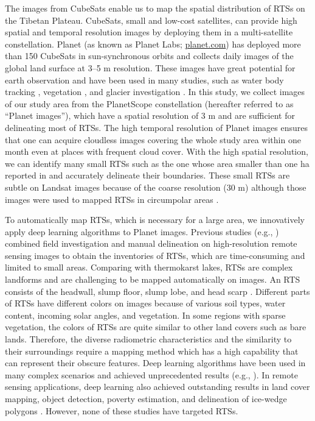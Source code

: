 \documentclass[preprint,12pt,authoryear]{elsarticle}
\begin{document}
The images from CubeSats enable us to map the spatial distribution of RTSs on the Tibetan Plateau. CubeSats, small and low-cost satellites, can provide high spatial and temporal resolution images by deploying them in a multi-satellite constellation. Planet (as known as Planet Labs; \url{planet.com}) has deployed more than 150 CubeSats in sun-synchronous orbits and collects daily images of the global land surface at 3--5 m resolution. These images have great potential for earth observation and have been used in many studies, such as water body tracking \citep{cooley2017tracking, cooley2019arctic, aragon2018cubesats, miles2018glacial}, vegetation \citep{houborg2016high, houborg2018daily}, and glacier investigation \citep{altena2017glacier}. In this study, we collect images of our study area from the PlanetScope constellation (hereafter referred to as “Planet images”), which have a spatial resolution of 3 m and are sufficient for delineating most of RTSs. The high temporal resolution of Planet images ensures that one can acquire cloudless images covering the whole study area within one month even at places with frequent cloud cover. With the high spatial resolution, we can identify many small RTSs such as the one whose area smaller than one ha reported in \cite{niu2012development,niu2016thaw} and accurately delineate their boundaries. These small RTSs are subtle on Landsat images because of the coarse resolution (30 m) although those images were used to mapped RTSs in circumpolar areas \citep{lacelle_distribution_2015, brooker2014mapping, nitze2018remote}. %

To automatically map RTSs, which is necessary for a large area, we innovatively apply deep learning algorithms to Planet images. Previous studies (e.g., \citealp{ramage_terrain_2017, lantuit_fifty_2008, niu2014thaw}) combined field investigation and manual delineation on high-resolution remote sensing images to obtain the inventories of RTSs, which are time-consuming and limited to small areas. Comparing with thermokarst lakes, RTSs are complex landforms and are challenging to be mapped automatically on images. An RTS consists of the headwall, slump floor, slump lobe, and head scarp \citep{lantuit_fifty_2008}. Different parts of RTSs have different colors on images because of various soil types, water content, incoming solar angles, and vegetation. In some regions with sparse vegetation, the colors of RTSs are quite similar to other land covers such as bare lands. Therefore, the diverse radiometric characteristics and the similarity to their surroundings require a mapping method which has a high capability that can represent their obscure features. Deep learning algorithms have been used in many complex scenarios and achieved unprecedented results (e.g., \citealp{krizhevsky_imagenet_2012, lecun_deep_2015, silver_mastering_2017}). In remote sensing applications, deep learning also achieved outstanding results in land cover mapping, object detection, poverty estimation, and delineation of ice-wedge polygons \citep{jean_combining_2016, guo_geospatial_2018, zhang2018deep}. However, none of these studies have targeted RTSs. 
\end{document}
